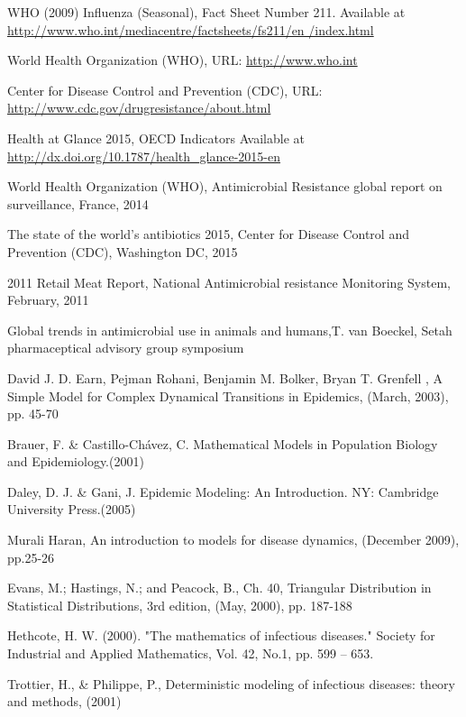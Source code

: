 \begin{thebibliography}{99}

WHO (2009) Influenza (Seasonal), Fact Sheet Number 211. Available at \url{http://www.who.int/mediacentre/factsheets/fs211/en /index.html}

World Health Organization (WHO), URL: \url{http://www.who.int}

Center for Disease Control and Prevention (CDC), URL: \url{http://www.cdc.gov/drugresistance/about.html}

Health at Glance 2015, OECD Indicators Available at \url{http://dx.doi.org/10.1787/health_glance-2015-en}

World Health Organization (WHO), Antimicrobial Resistance global report on surveillance, France, 2014

The state of the world’s antibiotics 2015, Center for Disease Control and Prevention (CDC), Washington DC, 2015

2011 Retail Meat Report, National  Antimicrobial resistance Monitoring System, February, 2011

Global trends in antimicrobial use in animals and humans,T. van Boeckel, Setah pharmaceptical advisory group symposium

David J. D. Earn, Pejman Rohani, Benjamin M. Bolker, Bryan T. Grenfell , A Simple Model for Complex Dynamical Transitions in Epidemics, (March, 2003), pp. 45-70

Brauer, F. \& Castillo-Chávez, C. Mathematical Models in Population Biology and Epidemiology.(2001)

Daley, D. J. \& Gani, J. Epidemic Modeling: An Introduction. NY: Cambridge University Press.(2005)

Murali Haran, An introduction to models for disease dynamics, (December 2009), pp.25-26

Evans, M.; Hastings, N.; and Peacock, B., Ch. 40, Triangular Distribution in Statistical Distributions, 3rd edition, (May, 2000), pp. 187-188

Hethcote, H. W. (2000). "The mathematics of infectious diseases." Society for Industrial and Applied Mathematics, Vol. 42, No.1, pp. 599 – 653.

Trottier, H., \& Philippe, P., Deterministic modeling of infectious diseases: theory and methods, (2001)


\end{thebibliography}



